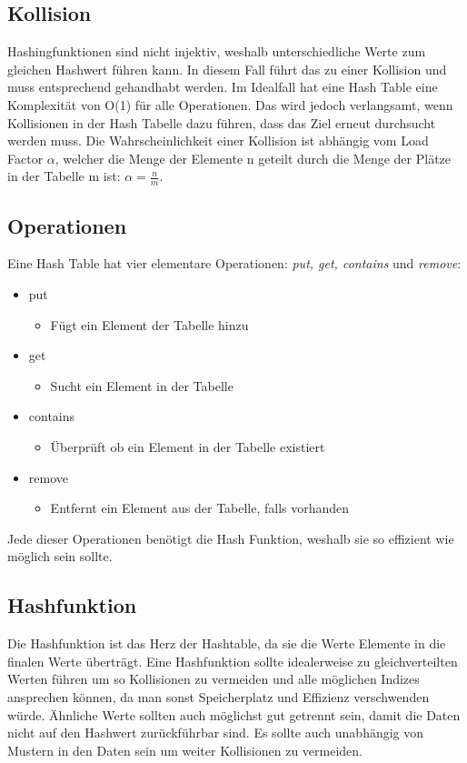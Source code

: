 \documentclass{article}
\begin{document}
	\subsection{Kollision}
	Hashingfunktionen sind nicht injektiv, weshalb unterschiedliche Werte zum gleichen Hashwert führen kann. In diesem Fall führt das zu einer Kollision und muss entsprechend gehandhabt werden. Im Idealfall hat eine Hash Table eine Komplexität von O(1) für alle Operationen. Das wird jedoch verlangsamt, wenn Kollisionen in der Hash Tabelle dazu führen, dass das Ziel erneut durchsucht werden muss. Die Wahrscheinlichkeit einer Kollision ist abhängig vom Load Factor $\alpha$, welcher die Menge der Elemente n geteilt durch die Menge der Plätze in der Tabelle m ist: $\alpha=\frac{n}{m}$.
	\subsection{Operationen}
	Eine Hash Table hat vier elementare Operationen: \textit{put, get, contains} und \textit{remove}:
	\begin{itemize}
		\item{put}
		\begin{itemize}
			\item{Fügt ein Element der Tabelle hinzu}
		\end{itemize}
		\item{get}
		\begin{itemize}
			\item{Sucht ein Element in der Tabelle}
		\end{itemize}
		\item{contains}
		\begin{itemize}
			\item{Überprüft ob ein Element in der Tabelle existiert}
		\end{itemize}
		\item{remove}
		\begin{itemize}
			\item{Entfernt ein Element aus der Tabelle, falls vorhanden}
		\end{itemize}
	\end{itemize}
	Jede dieser Operationen benötigt die Hash Funktion, weshalb sie so effizient wie möglich sein sollte.
	\subsection{Hashfunktion}
	Die Hashfunktion ist das Herz der Hashtable, da sie die Werte Elemente in die finalen Werte überträgt. Eine Hashfunktion sollte idealerweise zu gleichverteilten Werten führen um so Kollisionen zu vermeiden und alle möglichen Indizes ansprechen können, da man sonst Speicherplatz und Effizienz verschwenden würde. Ähnliche Werte sollten auch möglichst gut getrennt sein, damit die Daten nicht auf den Hashwert zurückführbar sind. Es sollte auch unabhängig von Mustern in den Daten sein um weiter Kollisionen zu vermeiden.
\end{document}
